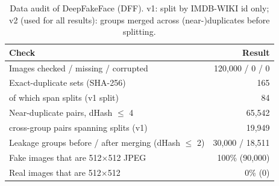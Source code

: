\begin{table}[!t]
\centering
\caption{Data audit of DeepFakeFace (DFF). v1: split by IMDB-WIKI id only; v2 (used for all results): groups merged across (near-)duplicates before splitting.}
\label{tab:audit}
\begin{tabular}{lr}
\toprule
Check & Result \\
\midrule
Images checked / missing / corrupted & 120,000 / 0 / 0 \\
Exact-duplicate sets (SHA-256) & 165 \\
\quad of which span splits (v1 split) & 84 \\
Near-duplicate pairs, dHash $\le$ 4 & 65,542 \\
\quad cross-group pairs spanning splits (v1) & 19,949 \\
Leakage groups before / after merging (dHash $\le$ 2) & 30,000 / 18,511 \\
Fake images that are 512$\times$512 JPEG & 100\% (90{,}000) \\
Real images that are 512$\times$512 & 0\% (0) \\
\bottomrule
\end{tabular}
\end{table}
